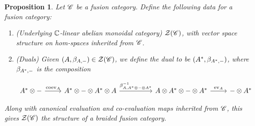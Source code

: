 \documentclass{article}
\newtheorem{proposition}{Proposition}[section]
\theoremstyle{definition}
\numberwithin{figure}{section}
\begin{document}
\begin{proposition}\label{drinfeld-fusion} Let $\mathscr{C}$ be a fusion category. Define the following data for a fusion category:

\begin{enumerate}
\item (Underlying $\mathbb{C}$-linear abelian monoidal category) $\mathcal{Z}(\mathscr{C})$, with vector space structure on hom-spaces inherited from $\mathscr{C}$.

\item (Duals) Given $(A,\beta_{A,\--})\in \mathcal{Z}(\mathscr{C})$, we define the dual to be $(A^*,\beta_{A^*,\--})$, where $\beta_{A^*,\--}$ is the composition

\[\begin{tikzcd}
	{A^*\otimes \--} & {A^*\otimes \-- \otimes A^*\otimes A} && {A\otimes A^*\otimes \-- \otimes A^*} & {\--\otimes A^*}
	\arrow["{\ev_A}", from=1-4, to=1-5]
	\arrow["{\coev_{A}}", from=1-1, to=1-2]
	\arrow["{\beta^{-1}_{A,A^*\otimes \-- \otimes A^*}}", from=1-2, to=1-4]
\end{tikzcd}\]
\end{enumerate}

Along with canonical evaluation and co-evaluation maps inherited from $\mathscr{C}$, this gives $\mathcal{Z}(\mathscr{C})$ the structure of a braided fusion category.
\end{proposition}
\end{document}
